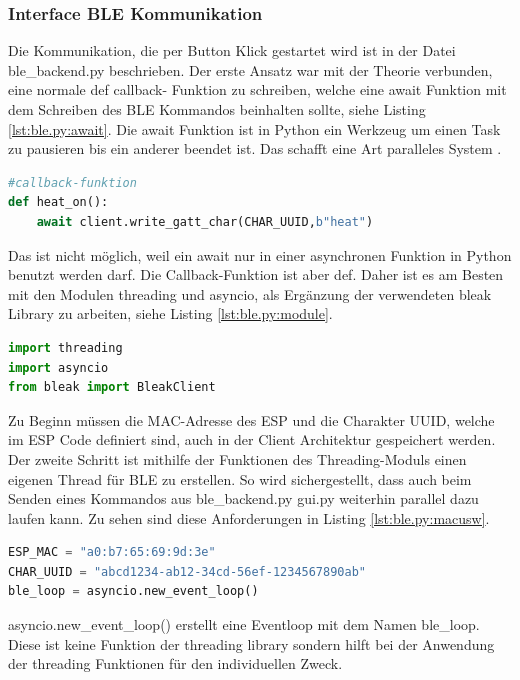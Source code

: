 \subsubsection{Interface BLE Kommunikation} %
Die Kommunikation, die per Button Klick gestartet wird ist in der Datei ble\_backend.py beschrieben.
Der erste Ansatz war mit der Theorie verbunden, eine normale def callback- Funktion zu schreiben,
welche eine await Funktion mit dem Schreiben des BLE Kommandos beinhalten sollte, siehe Listing \ref{lst:ble.py:await}. 
Die await Funktion ist in Python ein Werkzeug um einen Task zu pausieren bis ein anderer beendet ist. 
Das schafft eine Art paralleles System \cite{realpython_await}.
\begin{lstlisting}[language=Python, caption={Beispielcode, Falscher Ansatz}, label={lst:ble.py:await}, firstnumber=1]
#callback-funktion 
def heat_on():
    await client.write_gatt_char(CHAR_UUID,b"heat")
\end{lstlisting}
\noindent
Das ist nicht möglich, weil ein await nur in einer asynchronen Funktion in Python benutzt werden darf.
Die Callback-Funktion ist aber def.
Daher ist es am Besten mit den Modulen threading und asyncio, als Ergänzung der verwendeten bleak Library 
zu arbeiten, siehe Listing \ref{lst:ble.py:module}.
\begin{lstlisting}[language=Python, caption={Verwendete Module im Client Code}, label={lst:ble.py:module}, firstnumber=1]
import threading
import asyncio
from bleak import BleakClient
\end{lstlisting}
\noindent
Zu Beginn müssen die MAC-Adresse des ESP und die Charakter UUID, welche im ESP Code definiert sind, 
auch in der Client Architektur gespeichert werden. Der zweite Schritt ist mithilfe der
Funktionen des Threading-Moduls einen eigenen Thread für BLE zu erstellen. So wird sichergestellt, dass auch 
beim Senden eines Kommandos aus ble\_backend.py gui.py weiterhin parallel dazu laufen kann. Zu sehen sind diese 
Anforderungen in Listing \ref{lst:ble.py:macusw}.
\begin{lstlisting}[language=Python, caption={MAC, CHAR\_UUID und BLE Thread},label={lst:ble.py:macusw}, firstnumber=5]
ESP_MAC = "a0:b7:65:69:9d:3e" 
CHAR_UUID = "abcd1234-ab12-34cd-56ef-1234567890ab" 
ble_loop = asyncio.new_event_loop()     
\end{lstlisting}
\noindent
asyncio.new\_event\_loop() erstellt eine Eventloop mit dem Namen ble\_loop. Diese ist keine Funktion der threading library
sondern hilft bei der Anwendung der threading Funktionen für den individuellen Zweck. 


